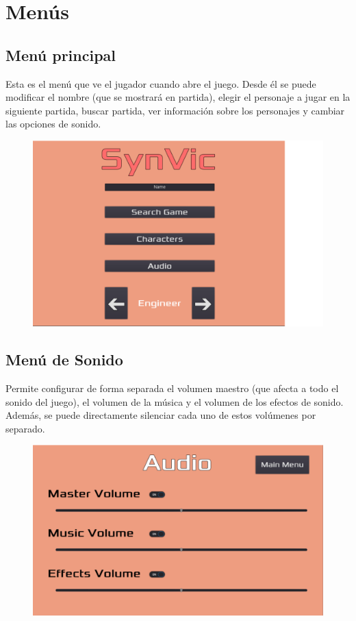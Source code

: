 \section{Menús}

\subsection{Menú principal}
Esta es el menú que ve el jugador cuando abre el juego. Desde él se puede modificar el nombre (que se mostrará en partida), elegir el personaje a jugar en la siguiente partida, buscar partida, ver información sobre los personajes y cambiar las opciones de sonido.

\vspace{\baselineskip}

\begin{figure}[H]
	\centering
	\includegraphics[width=0.7\linewidth]{figures/MainMenu}
	\label{fig:MainMenu}
\end{figure}

\vspace{\baselineskip}
\vspace{\baselineskip}

\subsection{Menú de Sonido}
Permite configurar de forma separada el volumen maestro (que afecta a todo el sonido del juego), el volumen de la música y el volumen de los efectos de sonido. Además, se puede directamente silenciar cada uno de estos volúmenes por separado.

\vspace{\baselineskip}

\begin{figure}[H]
	\centering
	\includegraphics[width=0.7\linewidth]{figures/AudioMenu}
	\label{fig:AudioMenu2}
\end{figure}

